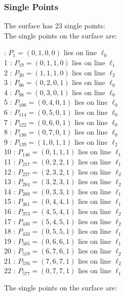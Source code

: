 \documentclass{article}
\begin{document}
{\subsubsection*{Single Points}
The surface has 23 single points:\\
The single points on the surface are:\\
\begin{multicols}{2}
 : $P_{1}=( 0, 1, 0, 0 )$ lies on line $\ell_{0}$\\
1 : $P_{19}=( 0, 1, 1, 0 )$ lies on line $\ell_{1}$\\
2 : $P_{20}=( 1, 1, 1, 0 )$ lies on line $\ell_{2}$\\
3 : $P_{90}=( 0, 2, 0, 1 )$ lies on line $\ell_{0}$\\
4 : $P_{98}=( 0, 3, 0, 1 )$ lies on line $\ell_{0}$\\
5 : $P_{106}=( 0, 4, 0, 1 )$ lies on line $\ell_{0}$\\
6 : $P_{114}=( 0, 5, 0, 1 )$ lies on line $\ell_{0}$\\
7 : $P_{122}=( 0, 6, 0, 1 )$ lies on line $\ell_{0}$\\
8 : $P_{130}=( 0, 7, 0, 1 )$ lies on line $\ell_{0}$\\
9 : $P_{139}=( 1, 0, 1, 1 )$ lies on line $\ell_{2}$\\
10 : $P_{146}=( 0, 1, 1, 1 )$ lies on line $\ell_{1}$\\
11 : $P_{217}=( 0, 2, 2, 1 )$ lies on line $\ell_{1}$\\
12 : $P_{227}=( 2, 3, 2, 1 )$ lies on line $\ell_{2}$\\
13 : $P_{284}=( 3, 2, 3, 1 )$ lies on line $\ell_{2}$\\
14 : $P_{289}=( 0, 3, 3, 1 )$ lies on line $\ell_{1}$\\
15 : $P_{361}=( 0, 4, 4, 1 )$ lies on line $\ell_{1}$\\
16 : $P_{373}=( 4, 5, 4, 1 )$ lies on line $\ell_{2}$\\
17 : $P_{430}=( 5, 4, 5, 1 )$ lies on line $\ell_{2}$\\
18 : $P_{433}=( 0, 5, 5, 1 )$ lies on line $\ell_{1}$\\
19 : $P_{505}=( 0, 6, 6, 1 )$ lies on line $\ell_{1}$\\
20 : $P_{519}=( 6, 7, 6, 1 )$ lies on line $\ell_{2}$\\
21 : $P_{576}=( 7, 6, 7, 1 )$ lies on line $\ell_{2}$\\
22 : $P_{577}=( 0, 7, 7, 1 )$ lies on line $\ell_{1}$\\
\end{multicols}
The single points on the surface are:\\
}
\end{document}
